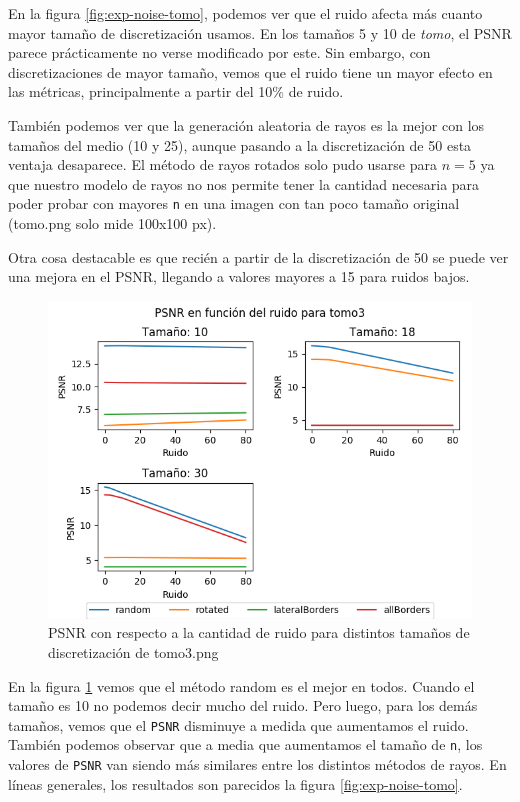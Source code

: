 En la figura \ref{fig:exp-noise-tomo}, podemos ver que el ruido afecta más cuanto mayor tamaño de discretización usamos.
En los tamaños 5 y 10 de \textit{tomo}, el PSNR parece prácticamente no verse modificado por este.
Sin embargo, con discretizaciones de mayor tamaño,
vemos que el ruido tiene un mayor efecto en las métricas,
principalmente a partir del 10\% de ruido.

También podemos ver que la generación aleatoria de rayos es la mejor con los tamaños del medio (10 y 25),
aunque pasando a la discretización de 50 esta ventaja desaparece.
El método de rayos rotados solo pudo usarse para $n=5$ ya que nuestro modelo de rayos
no nos permite tener la cantidad necesaria para poder probar con mayores \verb|n|
en una imagen con tan poco tamaño original (tomo.png solo mide 100x100 px).

Otra cosa destacable es que recién a partir de la discretización de 50 se puede ver una mejora
en el PSNR, llegando a valores mayores a 15 para ruidos bajos.

\begin{figure}[H]
    \centering
    \includegraphics[width=\textwidth]{../graficos/noise/tomo3/noise_graph.png}
    \caption{PSNR con respecto a la cantidad de ruido para distintos tamaños de discretización de tomo3.png}
    \label{fig:exp-noise-tomo3}
\end{figure}

En la figura \ref{fig:exp-noise-tomo3} vemos que el método random es el mejor en todos. Cuando el tamaño es 10 no podemos decir mucho del ruido. Pero luego, para los demás tamaños, vemos que el \verb|PSNR| disminuye a medida que aumentamos el ruido. También podemos observar que a media que aumentamos el tamaño de \verb|n|, los valores de \verb|PSNR| van siendo más similares entre los distintos métodos de rayos. En líneas generales, los resultados son parecidos la figura \ref{fig:exp-noise-tomo}. 

